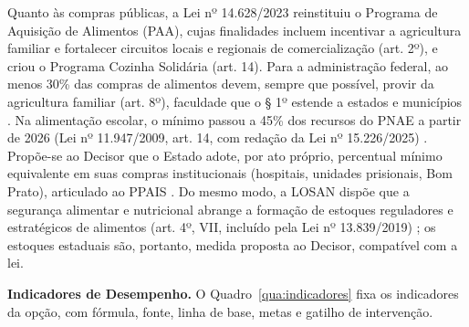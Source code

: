 \documentclass[
	12pt,				%
	openright,			%
	oneside,			%
	a4paper,			%
	chapter=TITLE,		%
	section=TITLE,		%
	english,			%
	french,				%
	spanish,			%
	brazil,				%
 ]{abntex2}
\begin{document}
Quanto às compras públicas, a Lei nº 14.628/2023 reinstituiu o Programa de
Aquisição de Alimentos (PAA), cujas finalidades incluem incentivar a
agricultura familiar e fortalecer circuitos locais e regionais de
comercialização (art. 2º), e criou o Programa Cozinha Solidária (art. 14). Para a
administração federal, ao menos 30\% das compras de alimentos devem, sempre que
possível, provir da agricultura familiar (art. 8º), faculdade que o § 1º estende
a estados e municípios \cite{brasil2023paa}. Na alimentação escolar, o mínimo
passou a 45\% dos recursos do PNAE a partir de 2026 (Lei nº 11.947/2009, art.
14, com redação da Lei nº 15.226/2025) \cite{brasil2025pnae}. Propõe-se ao
Decisor que o Estado adote, por ato próprio, percentual mínimo equivalente em
suas compras institucionais (hospitais, unidades prisionais, Bom Prato),
articulado ao PPAIS \cite{saopaulo2011ppais}. Do mesmo modo, a LOSAN dispõe que
a segurança alimentar e nutricional abrange a formação de estoques reguladores e
estratégicos de alimentos (art. 4º, VII, incluído pela Lei nº 13.839/2019)
\cite{brasil2019estoques}; os estoques estaduais são, portanto, medida proposta
ao Decisor, compatível com a lei.

\textbf{Indicadores de Desempenho.} O Quadro~\ref{qua:indicadores} fixa os
indicadores da opção, com fórmula, fonte, linha de base, metas e gatilho de
intervenção.
\end{document}
